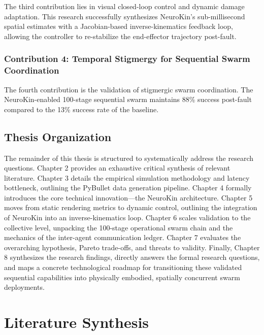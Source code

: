 \documentclass[12pt,a4paper,oneside]{report}
\begin{document}
The third contribution lies in visual closed-loop control and dynamic damage adaptation. This research successfully synthesizes NeuroKin's sub-millisecond spatial estimates with a Jacobian-based inverse-kinematics feedback loop, allowing the controller to re-stabilize the end-effector trajectory post-fault.

\subsection{Contribution 4: Temporal Stigmergy for Sequential Swarm Coordination}

The fourth contribution is the validation of stigmergic swarm coordination. The NeuroKin-enabled 100-stage sequential swarm maintains 88\% success post-fault compared to the 13\% success rate of the baseline.

\section{Thesis Organization}
\label{sec:thesis_organization_intro}

The remainder of this thesis is structured to systematically address the research questions. Chapter 2 provides an exhaustive critical synthesis of relevant literature. Chapter 3 details the empirical simulation methodology and latency bottleneck, outlining the PyBullet data generation pipeline. Chapter 4 formally introduces the core technical innovation---the NeuroKin architecture. Chapter 5 moves from static rendering metrics to dynamic control, outlining the integration of NeuroKin into an inverse-kinematics loop. Chapter 6 scales validation to the collective level, unpacking the 100-stage operational swarm chain and the mechanics of the inter-agent communication ledger. Chapter 7 evaluates the overarching hypothesis, Pareto trade-offs, and threats to validity. Finally, Chapter 8 synthesizes the research findings, directly answers the formal research questions, and maps a concrete technological roadmap for transitioning these validated sequential capabilities into physically embodied, spatially concurrent swarm deployments.

\clearpage

\chapter{Literature Synthesis}
\label{chap:literature_synthesis}
\end{document}
